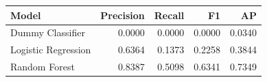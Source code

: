 \begin{tabular}{lrrrr}
\toprule
Model & Precision & Recall & F1 & AP\\
\midrule
Dummy Classifier & 0.0000 & 0.0000 & 0.0000 & 0.0340\\
Logistic Regression & 0.6364 & 0.1373 & 0.2258 & 0.3844\\
Random Forest & 0.8387 & 0.5098 & 0.6341 & 0.7349\\
\bottomrule
\end{tabular}
